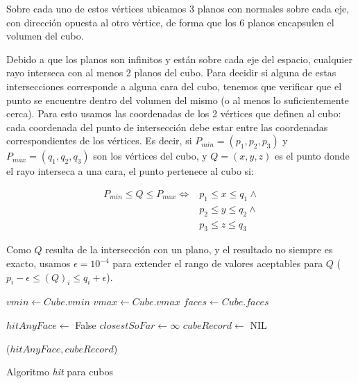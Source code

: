 Sobre cada uno de estos vértices ubicamos 3 planos con normales sobre cada eje,
con dirección opuesta al otro vértice, de forma que los 6 planos encapsulen el
volumen del cubo.

Debido a que los planos son infinitos y están sobre cada eje del espacio,
cualquier rayo interseca con al menos 2 planos del cubo. Para decidir si alguna
de estas intersecciones corresponde a alguna cara del cubo, tenemos que
verificar que el punto se encuentre dentro del volumen del mismo (o al menos lo
suficientemente cerca). Para esto usamos las coordenadas de los 2 vértices que
definen al cubo: cada coordenada del punto de intersección debe estar entre las
coordenadas correspondientes de los vértices. Es decir, si $P_{min}=(p_1, p_2,
  p_3)$ y $P_{max}=(q_1, q_2, q_3)$ son los vértices del cubo, y $Q=(x, y, z)$ es
el punto donde el rayo interseca a una cara, el punto pertenece al cubo si:

\begin{align*}
  P_{min} \le Q \le P_{max} \iff & p_1 \le x \le q_1 \land \\
                                 & p_2 \le y \le q_2 \land \\
                                 & p_3 \le z \le q_3
\end{align*}

Como $Q$ resulta de la intersección con un plano, y el resultado no siempre es
exacto, usamos $\epsilon = 10^{-4}$ para extender el rango de valores aceptables
para $Q$ ($p_i - \epsilon \le (Q)_i \le q_i + \epsilon$).

\begin{algorithm}
  \begin{algorithmic}[1]
    \State $vmin \gets Cube.vmin$ 
    \State $vmax \gets Cube.vmax$
    \State $faces \gets Cube.faces$

    \State $hitAnyFace \gets$ False
    \State $closestSoFar \gets \infty$
    \State $cubeRecord \gets$ NIL

     

    \EndIf
    \EndFor

    \State \Return ($hitAnyFace, cubeRecord$)
    \EndFunction
  \end{algorithmic}
  \caption{Algoritmo \textit{hit} para cubos}
  \label{alg:box-hit}
\end{algorithm}

